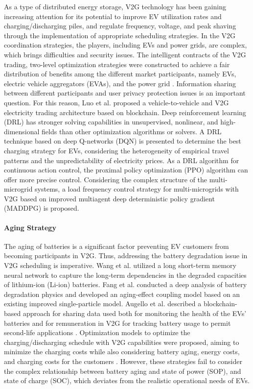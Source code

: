 \documentclass[journal,twoside]{IEEEtran}
\begin{document}
As a type of distributed energy storage, V2G technology has been gaining increasing attention for its potential to improve EV utilization rates and charging/discharging piles\cite{xu2022short}, and regulate frequency\cite{abubakr2023novel}, voltage\cite{hu2021distributed}, and peak shaving\cite{zhang2022transfer} through the implementation of appropriate scheduling strategies. In the V2G coordination strategies, the players, including EVs and power grids, are complex, which brings difficulties and security issues. The intelligent contracts of the V2G trading, two-level optimization strategies were constructed to achieve a fair distribution of benefits among the different market participants, namely EVs, electric vehicle aggregators (EVAs), and the power grid \cite{luo2022hierarchical}. Information sharing between different participants and user privacy protection issues is an important question. For this reason, Luo et al. proposed a vehicle-to-vehicle and V2G electricity trading architecture based on blockchain\cite{luo2021blockchain}. Deep reinforcement learning (DRL) has stronger solving capabilities in unsupervised, nonlinear, and high-dimensional fields than other optimization algorithms or solvers. A DRL technique based on deep Q-networks (DQN) is presented to determine the best charging strategy for EVs, considering the heterogeneity of empirical travel patterns and the unpredictability of electricity prices\cite{hao2023v2g}. As a DRL algorithm for continuous action control, the proximal policy optimization (PPO) algorithm can offer more precise control\cite{schulman2017proximal}. Considering the complex structure of the multi-microgrid systems, a load frequency control strategy for multi-microgrids with V2G based on improved multiagent deep deterministic policy gradient (MADDPG) is proposed\cite{fan2023load}.
\paragraph{Aging Strategy}

The aging of batteries is a significant factor preventing EV customers from becoming participants in V2G. Thus, addressing the battery degradation issue in V2G scheduling is imperative. Wang et al. utilized a long short-term memory neural network to capture the long-term dependencies in the degraded capacities of lithium-ion (Li-ion) batteries\cite{wang2018dynamic}. Fang et al. conducted a deep analysis of battery degradation physics and developed an aging-effect coupling model based on an existing improved single-particle model\cite{fang2023performance}. Augello et al. described a blockchain-based approach for sharing data used both for monitoring the health of the EVs' batteries and for remuneration in V2G for tracking battery usage to permit second-life applications \cite{augello2023certifying}. Optimization models to optimize the charging/discharging schedule with V2G capabilities were proposed, aiming to minimize the charging costs while also considering battery aging, energy costs, and charging costs for the customers \cite{manzolli2022electric, ebrahimi2020stochastic,li2020optimization}. However, these strategies fail to consider the complex relationship between battery aging and state of power (SOP), and state of charge (SOC), which deviates from the realistic operational needs of EVs.
\end{document}
